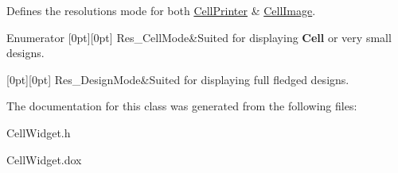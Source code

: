 Defines the resolutions mode for both \mbox{\hyperlink{classHurricane_1_1CellPrinter}{Cell\+Printer}} \& \mbox{\hyperlink{classHurricane_1_1CellImage}{Cell\+Image}}. \begin{DoxyEnumFields}{Enumerator}
[0pt][0pt]{}\mbox{\label{classHurricane_1_1CellWidget_a4b81fed78775d491c169b649870d9dd7af37fd1c10fd363f0ad04a94dbccd5789}} 
Res\+\_\+\+Cell\+Mode&Suited for displaying \textbf{ Cell} or very small designs. \\
\hline

[0pt][0pt]{}\mbox{\label{classHurricane_1_1CellWidget_a4b81fed78775d491c169b649870d9dd7a0c7c9bd939930fe178b5b8bcd84bdc1e}} 
Res\+\_\+\+Design\+Mode&Suited for displaying full fledged designs. \\
\hline

\end{DoxyEnumFields}


The documentation for this class was generated from the following files\+:\begin{DoxyCompactItemize}
\item 
Cell\+Widget.\+h\item 
Cell\+Widget.\+dox\end{DoxyCompactItemize}
